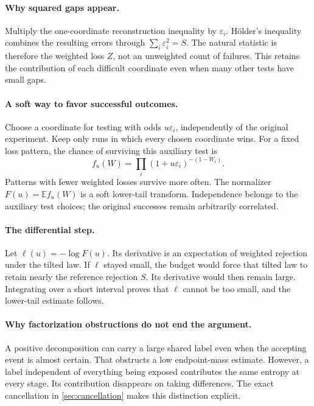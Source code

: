 \documentclass[11pt,reqno]{amsart}
\numberwithin{equation}{section}
\theoremstyle{definition}
\theoremstyle{remark}
\newcommand{\E}{\mathbb E}
\newcommand{\eps}{\varepsilon}
\begin{document}
\paragraph{Why squared gaps appear.}
Multiply the one-coordinate reconstruction inequality by \(\eps_i\). Hölder's inequality combines the resulting errors through \(\sum_i\eps_i^2=S\). The natural statistic is therefore the weighted loss \(Z\), not an unweighted count of failures. This retains the contribution of each difficult coordinate even when many other tests have small gaps.

\paragraph{A soft way to favor successful outcomes.}
Choose a coordinate for testing with odds \(u\eps_i\), independently of the original experiment. Keep only runs in which every chosen coordinate wins. For a fixed loss pattern, the chance of surviving this auxiliary test is
\[
 f_u(W)=\prod_i(1+u\eps_i)^{-(1-W_i)}.
\]
Patterns with fewer weighted losses survive more often. The normalizer \(F(u)=\E f_u(W)\) is a soft lower-tail transform. Independence belongs to the auxiliary test choices; the original successes remain arbitrarily correlated.

\paragraph{The differential step.}
Let \(\ell(u)=-\log F(u)\). Its derivative is an expectation of weighted rejection under the tilted law. If \(\ell\) stayed small, the budget would force that tilted law to retain nearly the reference rejection \(S\). Its derivative would then remain large. Integrating over a short interval proves that \(\ell\) cannot be too small, and the lower-tail estimate follows.

\paragraph{Why factorization obstructions do not end the argument.}
A positive decomposition can carry a large shared label even when the accepting event is almost certain. That obstructs a low endpoint-mass estimate. However, a label independent of everything being exposed contributes the same entropy at every stage. Its contribution disappears on taking differences. The exact cancellation in \cref{sec:cancellation} makes this distinction explicit.
\end{document}
